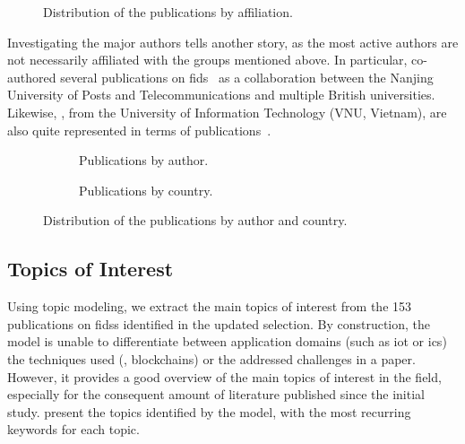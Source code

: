 \begin{figure}
  \centering
  
  \caption{
    Distribution of the publications by affiliation.
    \label{fig:sota.affiliations}
  }
\end{figure}

Investigating the major authors tells another story, as the most active authors are not necessarily affiliated with the groups mentioned above.
In particular,  co-authored several publications on \gls{fids}~\cite{popoola_FederatedDeepLearning_2021,popoola_FederatedDeepLearning_2021a,popoola_OptimizingDeepLearning_2022,popoola_FederatedDeepLearning_2023} as a collaboration between the Nanjing University of Posts and Telecommunications and multiple British universities.
Likewise, , from the University of Information Technology (VNU, Vietnam), are also quite represented in terms of publications~\cite{duy_Federatedlearningbasedintrusion_2021,vy_FederatedLearningBasedIntrusion_2021,thi_FederatedLearningBasedCyber_2022,quyen_FederatedIntrusionDetection_2022}.
  
\begin{figure}
  \centering
  \begin{subfigure}{0.48\textwidth}
    \centering
    
    \caption{
      Publications by author.
      \label{fig:sota.authors}
    }
  \end{subfigure}
  \hfill
  \begin{subfigure}{0.48\textwidth}
    \centering
    
    \caption{
      Publications by country.
      \label{fig:sota.countries}
    }
  \end{subfigure}
  \caption{
    Distribution of the publications by author and country.
    \label{fig:sota.authors-countries}
  }
\end{figure}


\subsection{Topics of Interest\label{sec:sota.quanti.topics}}

Using topic modeling, we extract the main topics of interest from the 153 publications on \glspl{fids} identified in the updated selection.
By construction, the model is unable to differentiate between application domains (such as \gls{iot} or \gls{ics}) the techniques used (\eg, blockchains) or the addressed challenges in a paper.
However, it provides a good overview of the main topics of interest in the field, especially for the consequent amount of literature published since the initial study.
 present the topics identified by the model, with the most recurring keywords for each topic.


